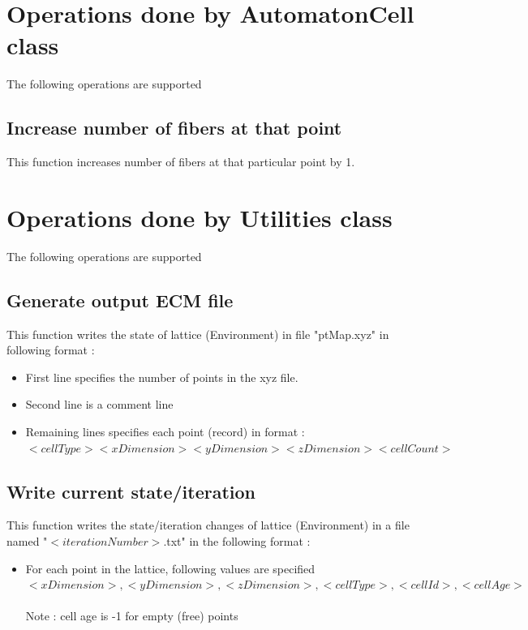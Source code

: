 \documentclass[11pt]{report}
\begin{document}
  \section{\color{red} Operations done by AutomatonCell class}
  The following operations are supported
  \subsection{\color{blue}Increase number of fibers at that point}
  This function increases number of fibers at that particular point by 1.
  
  \section{\color{red} Operations done by Utilities class}
  The following operations are supported
  \subsection{\color{blue}Generate output ECM file}
  This function writes the state of lattice (Environment) in file "ptMap.xyz" in following format : \\
  \begin{itemize}
    \item First line specifies the number of points in the xyz file.
    \item Second line is a comment line
    \item Remaining lines specifies each point (record) in format : \\
    $<cell Type> <x Dimension> <y Dimension> <z Dimension> <cell Count>$
   \end{itemize}
   \subsection{\color{blue}Write current state/iteration}
   This function writes the state/iteration changes of lattice (Environment) in a file named "$<iterationNumber>$.txt" in the following format :
   \begin{itemize}
    \item For each point in the lattice, following values are specified \\
    $<x Dimension>,<y Dimension>,<z Dimension>,<cell Type>,<cell Id>,<cell Age>$ \\ \\
    Note : cell age is -1 for empty (free) points 
   \end{itemize}
   
\end{document}
